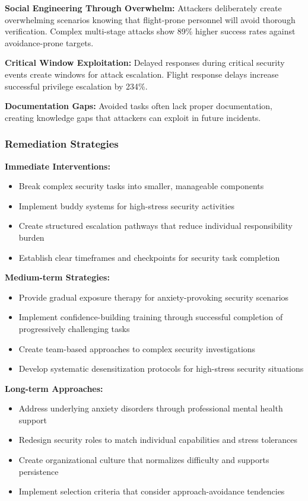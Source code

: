 \documentclass[11pt,a4paper]{article}
\begin{document}
\textbf{Social Engineering Through Overwhelm:} Attackers deliberately create overwhelming scenarios knowing that flight-prone personnel will avoid thorough verification. Complex multi-stage attacks show 89\% higher success rates against avoidance-prone targets\cite{overwhelm2021}.

\textbf{Critical Window Exploitation:} Delayed responses during critical security events create windows for attack escalation. Flight response delays increase successful privilege escalation by 234\%\cite{windows2023}.

\textbf{Documentation Gaps:} Avoided tasks often lack proper documentation, creating knowledge gaps that attackers can exploit in future incidents\cite{documentation2022}.

\subsubsection{Remediation Strategies}

\textbf{Immediate Interventions:}
\begin{itemize}
\item Break complex security tasks into smaller, manageable components
\item Implement buddy systems for high-stress security activities
\item Create structured escalation pathways that reduce individual responsibility burden
\item Establish clear timeframes and checkpoints for security task completion
\end{itemize}

\textbf{Medium-term Strategies:}
\begin{itemize}
\item Provide gradual exposure therapy for anxiety-provoking security scenarios
\item Implement confidence-building training through successful completion of progressively challenging tasks
\item Create team-based approaches to complex security investigations
\item Develop systematic desensitization protocols for high-stress security situations
\end{itemize}

\textbf{Long-term Approaches:}
\begin{itemize}
\item Address underlying anxiety disorders through professional mental health support
\item Redesign security roles to match individual capabilities and stress tolerances
\item Create organizational culture that normalizes difficulty and supports persistence
\item Implement selection criteria that consider approach-avoidance tendencies
\end{itemize}
\end{document}
